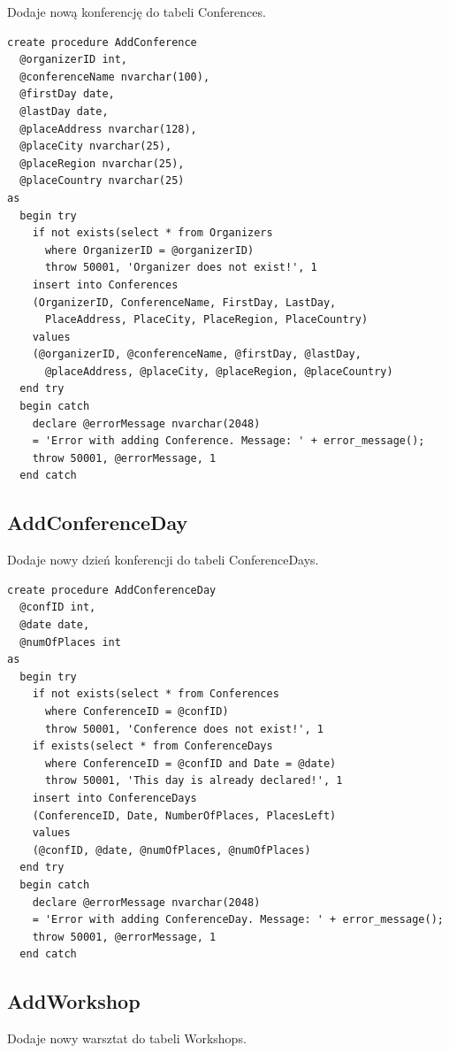 \documentclass[12pt, a4paper]{mwrep}
\begin{document}
\noindent Dodaje nową konferencję do tabeli Conferences.

\begin{lstlisting}
create procedure AddConference
  @organizerID int,
  @conferenceName nvarchar(100),
  @firstDay date,
  @lastDay date,
  @placeAddress nvarchar(128),
  @placeCity nvarchar(25),
  @placeRegion nvarchar(25),
  @placeCountry nvarchar(25)
as
  begin try
    if not exists(select * from Organizers 
      where OrganizerID = @organizerID)
      throw 50001, 'Organizer does not exist!', 1
    insert into Conferences
    (OrganizerID, ConferenceName, FirstDay, LastDay,
      PlaceAddress, PlaceCity, PlaceRegion, PlaceCountry)
    values
    (@organizerID, @conferenceName, @firstDay, @lastDay, 
      @placeAddress, @placeCity, @placeRegion, @placeCountry)
  end try
  begin catch
    declare @errorMessage nvarchar(2048)
    = 'Error with adding Conference. Message: ' + error_message();
    throw 50001, @errorMessage, 1
  end catch
\end{lstlisting}

\subsection{AddConferenceDay}

\noindent Dodaje nowy dzień konferencji do tabeli ConferenceDays.

\begin{lstlisting}
create procedure AddConferenceDay
  @confID int,
  @date date,
  @numOfPlaces int
as
  begin try
    if not exists(select * from Conferences 
      where ConferenceID = @confID)
      throw 50001, 'Conference does not exist!', 1
    if exists(select * from ConferenceDays 
      where ConferenceID = @confID and Date = @date)
      throw 50001, 'This day is already declared!', 1
    insert into ConferenceDays
    (ConferenceID, Date, NumberOfPlaces, PlacesLeft)
    values
    (@confID, @date, @numOfPlaces, @numOfPlaces)
  end try
  begin catch
    declare @errorMessage nvarchar(2048)
    = 'Error with adding ConferenceDay. Message: ' + error_message();
    throw 50001, @errorMessage, 1
  end catch
\end{lstlisting}

\subsection{AddWorkshop}

\noindent Dodaje nowy warsztat do tabeli Workshops.
\end{document}
